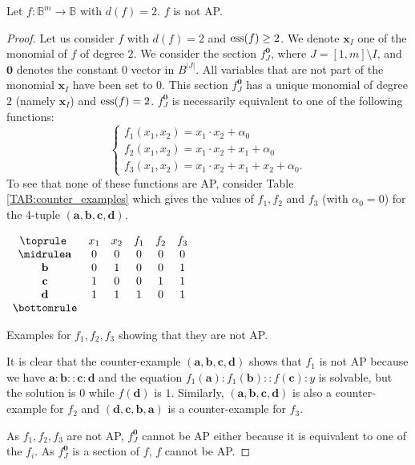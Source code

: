 \begin{property} \label{degree_2_not_AP}
 Let $f\colon \mathbb{B}^m\to \mathbb{B}$ with $d(f)=2$. $f$ is not AP.
\end{property}
\begin{proof}
  Let us consider $f$ with $d(f) = 2$ and $\operatorname{ess}(f) \geq 2$. We denote
  $\mathbf{x}_I$ one of the monomial of $f$ of degree $2$. We consider the
  section $f^{\mathbf{0}}_J$, where $J = [1, m] \setminus I$,  and $\mathbf{0}$
  denotes the constant 0 vector in $B^{|J|}$. All variables that are not part
  of the monomial $\mathbf{x}_I$ have been set to $0$. This section
  $f^{\mathbf{0}}_J$ has a unique monomial of degree $2$ (namely
  $\mathbf{x}_I$) and $\operatorname{ess}(f) = 2$.  $f^{\mathbf{0}}_J$ is necessarily
  equivalent to one of the following functions:
  $$
  \begin{cases}
    f_1(x_1, x_2) = x_1 \cdot x_2 + \alpha_0 \\
    f_2(x_1, x_2) = x_1 \cdot x_2 + x_1 + \alpha_0\\
    f_3(x_1, x_2) = x_1 \cdot x_2 + x_1 + x_2 + \alpha_0.
  \end{cases}$$
  To see that none of these functions are AP, consider Table
  \ref{TAB:counter_examples} which gives the values of $f_1, f_2$ and $f_3$
  (with $\alpha_0 = 0$) for the 4-tuple $(\mathbf{a}, \mathbf{b},
  \mathbf{c}, \mathbf{d})$.
  \begin{table}[ht]
    \center
  $\begin{array}{cccccc}
    \toprule
    ~ & x_1 & x_2 & f_1 & f_2 & f_3\\
    \midrule
    \mathbf{a} & 0 & 0 & 0 & 0 & 0\\
    \mathbf{b} & 0 & 1 & 0 & 0 & 1\\
    \mathbf{c} & 1 & 0 & 0 & 1 & 1\\
    \mathbf{d} & 1 & 1 & 1 & 0 & 1\\
    \bottomrule
  \end{array}
  $\bigskip
  \caption{Examples for $f_1, f_2, f_3$ showing that they are not AP.}
  \label{TAB:counter_examples}
  \end{table}
  It is clear that the counter-example $(\mathbf{a},\mathbf{b}, \mathbf{c},
  \mathbf{d})$  shows that $f_1$  is not AP because we have $\mathbf{a} :
  \mathbf{b} :: \mathbf{c} : \mathbf{d}$ and the equation $f_1(\mathbf{a}) :
  f_1(\mathbf{b}) :: f(\mathbf{c}) : y$ is solvable, but the solution is $0$
  while $f(\mathbf{d})$ is $1$. Similarly, $(\mathbf{a},\mathbf{b}, \mathbf{c},
  \mathbf{d})$ is also a counter-example for $f_2$ and $(\mathbf{d},\mathbf{c},
  \mathbf{b}, \mathbf{a})$ is a counter-example for $f_3$.

  As $f_1, f_2, f_3$ are not AP, $f^{\mathbf{0}}_J$ cannot be AP either because
  it is equivalent to one of the $f_i$. As $f^{\mathbf{0}}_J$ is a section of
  $f$, $f$ cannot be AP.
\end{proof}

